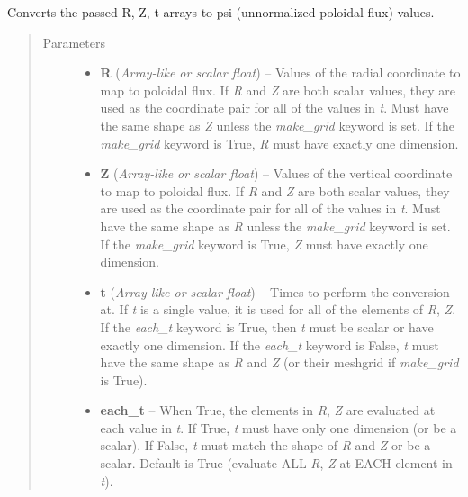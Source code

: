 \documentclass[letterpaper,10pt,english]{sphinxmanual}
\begin{document}
\begin{fulllineitems}
\begin{fulllineitems}
\end{fulllineitems}


\begin{fulllineitems}
\label{eqtools:eqtools.core.Equilibrium.rz2psi}
Converts the passed R, Z, t arrays to psi (unnormalized poloidal flux) values.
\begin{quote}\begin{description}
\item[{Parameters}] \leavevmode\begin{itemize}
\item {} 
\textbf{R} (\emph{Array-like or scalar float}) -- Values of the radial coordinate to
map to poloidal flux. If \emph{R} and \emph{Z} are both scalar values,
they are used as the coordinate pair for all of the values in
\emph{t}. Must have the same shape as \emph{Z} unless the \emph{make\_grid}
keyword is set. If the \emph{make\_grid} keyword is True, \emph{R} must
have exactly one dimension.

\item {} 
\textbf{Z} (\emph{Array-like or scalar float}) -- Values of the vertical coordinate to
map to poloidal flux. If \emph{R} and \emph{Z} are both scalar values,
they are used as the coordinate pair for all of the values in
\emph{t}. Must have the same shape as \emph{R} unless the \emph{make\_grid}
keyword is set. If the \emph{make\_grid} keyword is True, \emph{Z} must
have exactly one dimension.

\item {} 
\textbf{t} (\emph{Array-like or scalar float}) -- Times to perform the conversion at.
If \emph{t} is a single value, it is used for all of the elements of
\emph{R}, \emph{Z}. If the \emph{each\_t} keyword is True, then \emph{t} must be
scalar or have exactly one dimension. If the \emph{each\_t} keyword is
False, \emph{t} must have the same shape as \emph{R} and \emph{Z} (or their
meshgrid if \emph{make\_grid} is True).

\item {} 
\textbf{each\_t} -- When True, the elements in \emph{R}, \emph{Z} are evaluated
at each value in \emph{t}. If True, \emph{t} must have only one dimension
(or be a scalar). If False, \emph{t} must match the shape of \emph{R} and
\emph{Z} or be a scalar. Default is True (evaluate ALL \emph{R}, \emph{Z} at
EACH element in \emph{t}).


\end{itemize}
\end{description}
\end{quote}
\end{fulllineitems}
\end{fulllineitems}
\end{document}
